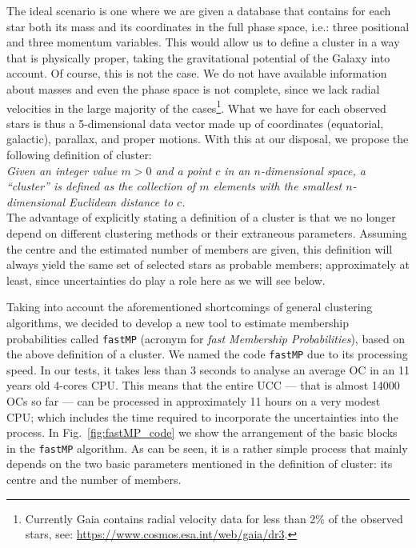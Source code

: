 \documentclass[fleqn,usenatbib]{mnras}
\begin{document}
The ideal scenario is one where we are given a database that contains for
each star both its mass and its coordinates in the full phase space, i.e.: three
positional and three momentum variables. This would allow us to define a cluster
in a way that is physically proper, taking the gravitational potential of the
Galaxy into account. Of course, this is not the case. We do not have available
information about masses and even the phase space is not complete,
since we lack radial velocities in the large majority of the
cases\footnote{Currently Gaia contains radial velocity data for less than 2\% of
the observed stars, see: \url{https://www.cosmos.esa.int/web/gaia/dr3}.}. What
we have for each observed stars is thus a 5-dimensional data vector made up of
coordinates (equatorial, galactic), parallax, and proper motions. With this at
our disposal, we propose the following definition of cluster:\\

\noindent\emph{Given an integer value $m>0$ and a point $c$ in an
$n$-dimensional space, a ``cluster'' is defined as the collection of $m$
elements with the smallest $n$-dimensional Euclidean distance to $c$.}\\

The advantage of explicitly stating a definition of a cluster is that we no
longer depend on different clustering methods or their extraneous parameters.
Assuming the centre and the estimated number of members are given, this
definition will always yield the same set of selected stars as probable members;
approximately at least, since uncertainties do play a role here as we will see
below.

Taking into account the aforementioned shortcomings of general clustering
algorithms, we decided to develop a new tool to estimate membership
probabilities called \texttt{fastMP} (acronym for \emph{fast Membership
Probabilities}), based on the above definition of a cluster.
We named the code \texttt{fastMP} due to its processing speed. In our
tests, it takes less than 3 seconds to analyse an average OC in an 11 years old
4-cores CPU. This means that the entire UCC --- that is almost 14000 OCs so far
--- can be processed in approximately 11 hours on a very modest CPU; which
includes the time required to incorporate the uncertainties into the process.
%
In Fig.~\ref{fig:fastMP_code} we show the arrangement of the basic blocks in
the \texttt{fastMP} algorithm. As can be seen, it is a rather simple process
that mainly depends on the two basic parameters mentioned in the definition of
cluster: its centre and the number of members.
\end{document}
